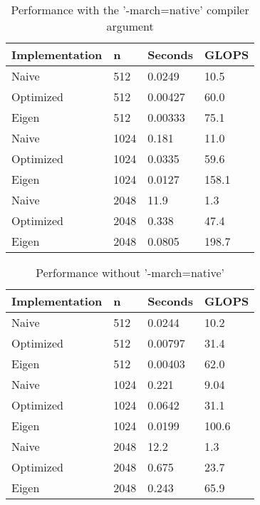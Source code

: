 \documentclass{article}
\begin{document}
\begin{table}[]
\begin{centering}
\begin{tabular}{|l|l|l|l|}
\hline
Implementation & n    & Seconds   & GLOPS   \\ \hline
Naive          & 512  & 0.0249    & 10.5    \\ \hline
Optimized      & 512  & 0.00427   & 60.0    \\ \hline
Eigen          & 512  & 0.00333   & 75.1    \\ \hline
Naive          & 1024 & 0.181     & 11.0    \\ \hline
Optimized      & 1024 & 0.0335    & 59.6    \\ \hline
Eigen          & 1024 & 0.0127    & 158.1   \\ \hline
Naive          & 2048 & 11.9      & 1.3     \\ \hline
Optimized      & 2048 & 0.338     & 47.4    \\ \hline
Eigen          & 2048 & 0.0805    & 198.7   \\ \hline
\end{tabular}
\caption{Performance with the '-march=native' compiler argument}
\end{centering}
\end{table}


\begin{table}[]
\begin{centering}
\begin{tabular}{|l|l|l|l|}
\hline
Implementation & n    & Seconds   & GLOPS   \\ \hline
Naive          & 512  & 0.0244    & 10.2    \\ \hline
Optimized      & 512  & 0.00797   & 31.4    \\ \hline
Eigen          & 512  & 0.00403   & 62.0    \\ \hline
Naive          & 1024 & 0.221     & 9.04    \\ \hline
Optimized      & 1024 & 0.0642    & 31.1    \\ \hline
Eigen          & 1024 & 0.0199    & 100.6   \\ \hline
Naive          & 2048 & 12.2      & 1.3     \\ \hline
Optimized      & 2048 & 0.675     & 23.7    \\ \hline
Eigen          & 2048 & 0.243     & 65.9    \\ \hline
\end{tabular}
\caption{Performance without '-march=native'}
\end{centering}
\end{table}
\end{document}
